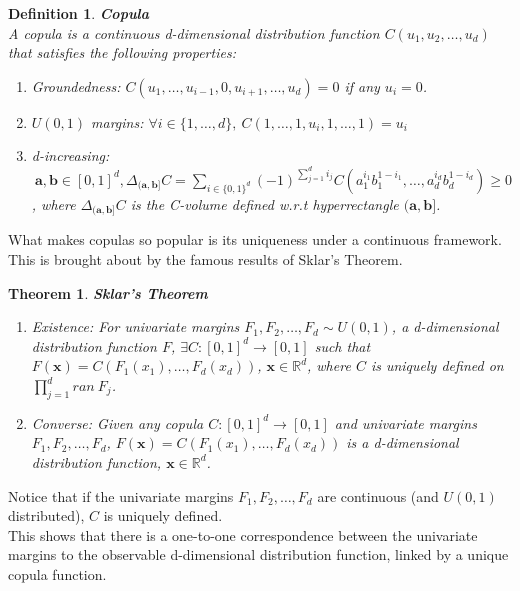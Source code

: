 \documentclass[12pt]{report}
\newtheorem{theorem}{Theorem}[subsection]
\newtheorem{definition}{Definition}[subsection]
\newcommand{\1}{\mathbf{1}}
\begin{document}
\begin{flushleft}
\begin{definition}\label{CopProperties}
\textbf{Copula} \\
A copula is a continuous d-dimensional distribution function $C(u_{1}, u_{2}, \dots, u_{d}) $ that satisfies the following properties: \\
\begin{enumerate}
    \item Groundedness: \: $C(u_{1}, \dots, u_{i-1}, 0, u_{i+1}, \dots, u_{d}) = 0$ if any $u_{i} = 0$.\\
    \item $U(0,1)$ margins: \: $\forall i \in \{1, \dots,d\}, \: C(1, \dots, 1, u_{i}, 1, \dots, 1) = u_{i}$\\
    \item d-increasing: $\: \textbf{a}, \textbf{b} \in [0,1]^{d}, \Delta_{(\textbf{a},\textbf{b}]}C = \sum\limits_{i \in \{0,1\}^{d}} (-1)^{\sum_{j=1}^{d}i_{j}}C(a_{1}^{i_{1}}b_{1}^{1-i_{1}}, \dots, a_{d}^{i_{d}}b_{d}^{1-i_{d}})  \ge 0 $, \: where $\Delta_{(\textbf{a},\textbf{b}]}C$ is the C-volume defined w.r.t hyperrectangle $(\textbf{a},\textbf{b}]$.
\end{enumerate}
\end{definition}


What makes copulas so popular is its uniqueness under a continuous framework. This is brought about by the famous results of Sklar's Theorem.

\begin{theorem}\label{SklarTheorem}
\textit{\normalfont \parencite{SklarTheorem}}
\textbf{Sklar's Theorem}
\vspace{-0.2cm}
\begin{enumerate}
    \item Existence: For univariate margins $F_{1}, F_{2}, \dots, F_{d} \sim U(0,1)$, a d-dimensional distribution function $F$, $\exists C: [0,1]^{d} \rightarrow [0,1]$ such that $F(\textbf{x}) = C(F_{1}(x_{1}), \dots, F_{d}(x_{d}))$, $\textbf{x} \in \mathbb{R}^{d}$, where $C$ is uniquely defined on $\prod_{j=1}^{d} ran \: F_{j}$.
    \item Converse: Given any copula $C: [0,1]^{d} \rightarrow [0,1]$ and univariate margins $F_{1}, F_{2}, \dots, F_{d}$, $F(\textbf{x}) = C(F_{1}(x_{1}), \dots, F_{d}(x_{d}))$ is a d-dimensional distribution function, $\textbf{x} \in \mathbb{R}^{d}$.
\end{enumerate}
\end{theorem}
Notice that if the univariate margins $F_{1}, F_{2}, \dots, F_{d}$ are continuous (and $U(0,1)$ distributed), $C$ is uniquely defined. \\
\vspace{0.5cm}
This shows that there is a one-to-one correspondence between the univariate margins to the observable d-dimensional distribution function, linked by a unique copula function. \\
\vspace{0.5cm}


\end{flushleft}
\end{document}
